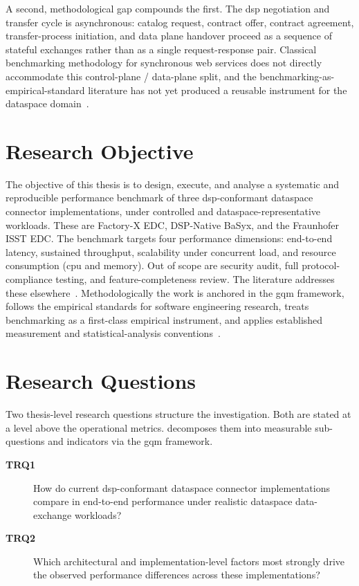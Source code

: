 A second, methodological gap compounds the first. The \gls{dsp} negotiation and transfer cycle is asynchronous: catalog request, contract offer, contract agreement, transfer-process initiation, and data plane handover proceed as a sequence of stateful exchanges rather than as a single request-response pair. Classical benchmarking methodology for synchronous web services does not directly accommodate this control-plane / data-plane split, and the benchmarking-as-empirical-standard literature has not yet produced a reusable instrument for the dataspace domain~\citep{hasselbring2021benchmarking, Ralph2020}.


\section{Research Objective}\label{sec:research-objective}

The objective of this thesis is to design, execute, and analyse a systematic and reproducible performance benchmark of three \gls{dsp}-conformant dataspace connector implementations, under controlled and dataspace-representative workloads. These are Factory-X EDC, DSP-Native BaSyx, and the Fraunhofer ISST EDC. The benchmark targets four performance dimensions: end-to-end latency, sustained throughput, scalability under concurrent load, and resource consumption (\gls{cpu} and memory). Out of scope are security audit, full protocol-compliance testing, and feature-completeness review. The literature addresses these elsewhere~\citep{dam2024surveydataspaceconnectorimplementations}. Methodologically the work is anchored in the \gls{gqm} framework, follows the empirical standards for software engineering research, treats benchmarking as a first-class empirical instrument, and applies established measurement and statistical-analysis conventions~\citep{caldiera1994goal, Ralph2020, hasselbring2021benchmarking, jain1991art}.


\section{Research Questions}\label{sec:research-questions}

Two thesis-level research questions structure the investigation. Both are stated at a level above the operational metrics.  decomposes them into measurable sub-questions and indicators via the \gls{gqm} framework.

\begin{description}
    \item[\textbf{TRQ1}] How do current \gls{dsp}-conformant dataspace connector implementations compare in end-to-end performance under realistic dataspace data-exchange workloads?
    \item[\textbf{TRQ2}] Which architectural and implementation-level factors most strongly drive the observed performance differences across these implementations?
\end{description}

